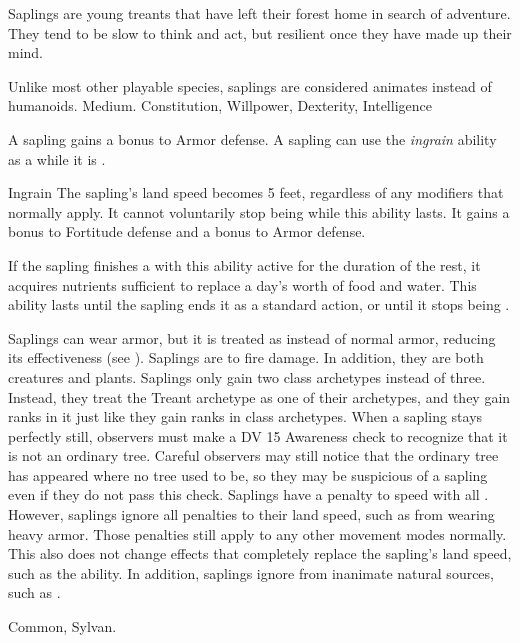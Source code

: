     Saplings are young treants that have left their forest home in search of adventure.
    They tend to be slow to think and act, but resilient once they have made up their mind.

     Unlike most other playable species, saplings are considered animates instead of humanoids.
     Medium.
      Constitution,  Willpower,  Dexterity,  Intelligence
    \begin{itemize}
         A sapling gains a  bonus to Armor defense.
         A sapling can use the \textit{ingrain} ability as a  while it is .
            \begin{activeability}{Ingrain}
                \rankline
                The sapling's land speed becomes 5 feet, regardless of any modifiers that normally apply.
                It cannot voluntarily stop being  while this ability lasts.
                It gains a  bonus to Fortitude defense and a  bonus to Armor defense.

                If the sapling finishes a  with this ability active for the duration of the rest, it acquires nutrients sufficient to replace a day's worth of food and water.
                This ability lasts until the sapling ends it as a standard action, or until it stops being .
            \end{activeability}
         Saplings can wear armor, but it is treated as  instead of normal armor, reducing its effectiveness (see ).
         Saplings are \vulnerable to fire damage. In addition, they are both creatures and plants.
         Saplings only gain two class archetypes instead of three.
            Instead, they treat the Treant archetype as one of their archetypes, and they gain ranks in it just like they gain ranks in class archetypes.
         When a sapling stays perfectly still, observers must make a DV 15 Awareness check to recognize that it is not an ordinary tree.
        Careful observers may still notice that the ordinary tree has appeared where no tree used to be, so they may be suspicious of a sapling even if they do not pass this check.
         Saplings have a  penalty to speed with all .
            However, saplings ignore all penalties to their land speed, such as from wearing heavy armor.
            Those penalties still apply to any other movement modes normally.
            This also does not change effects that completely replace the sapling's land speed, such as the  ability.
            In addition, saplings ignore  from inanimate natural sources, such as .
    \end{itemize}
     Common, Sylvan.

